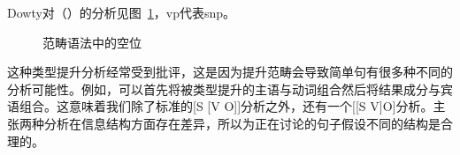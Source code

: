 \begin{exe}
\begin{xlist}[iv.]
\begin{exe}
\begin{xlist}[iv.]
\noindent
Dowty对（）的分析见图~\ref{Abb-CG-Gapping}，vp代表s\bs np。
\begin{figure}
\caption{\label{Abb-CG-Gapping}范畴语法中的空位}
\end{figure}%
这种类型提升分析经常受到批评，这是因为提升范畴会导致简单句有很多种不同的分析可能性。例如，可以首先将被类型提升的主语与动词组合然后将结果成分与宾语组合。这意味着我们除了标准的[S [V O]]分析之外，还有一个[[S V]O]分析。\citet{Steedman91a}主张两种分析在信息结构方面存在差异，所以为正在讨论的句子假设不同的结构是合理的。


\end{xlist}
\end{exe}
\end{xlist}
\end{exe}
